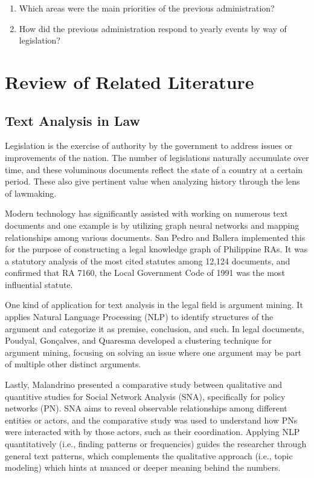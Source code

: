 \documentclass[conference]{IEEEtran}
\begin{document}
\begin{enumerate}
    \item Which areas were the main priorities of the previous administration?
    \item How did the previous administration respond to yearly events by way of legislation?
\end{enumerate}

\section{Review of Related Literature}

\subsection{Text Analysis in Law}
Legislation is the exercise of authority by the government to address issues or improvements of the nation. The number of legislations naturally accumulate over time, and these voluminous documents reflect the state of a country at a certain period. These also give pertinent value when analyzing history through the lens of lawmaking.

Modern technology has significantly assisted with working on numerous text documents and one example is by utilizing graph neural networks and mapping relationships among various documents. San Pedro and Ballera\cite{graphsage} implemented this for the purpose of constructing a legal knowledge graph of Philippine RAs. It was a statutory analysis of the most cited statutes among 12,124 documents, and confirmed that RA 7160, the Local Government Code of 1991 was the most influential statute.

One kind of application for text analysis in the legal field is argument mining. It applies Natural Language Processing (NLP) to identify structures of the argument and categorize it as premise, conclusion, and such. In legal documents, Poudyal, Gonçalves, and Quaresma\cite{cluster} developed a clustering technique for argument mining, focusing on solving an issue where one argument may be part of multiple other distinct arguments.

Lastly, Malandrino\cite{sna} presented a comparative study between qualitative and quantitive studies for Social Network Analysis (SNA), specifically for policy networks (PN). SNA aims to reveal observable relationships among different entities or actors, and the comparative study was used to understand how PNs were interacted with by those actors, such as their coordination. Applying NLP quantitatively (i.e., finding patterns or frequencies) guides the researcher through general text patterns, which complements the qualitative approach (i.e., topic modeling) which hints at nuanced or deeper meaning behind the numbers.
\end{document}
